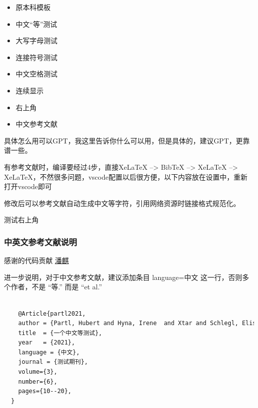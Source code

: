 \documentclass[AutoFakeBold]{LUTThesis}
\begin{document}
\begin{itemize}
    \item 原本科模板\cite{partl2016}
    \item 中文“等”测试\cite{partl2021}
    \item 大写字母测试\cite{partl2022-2}
    \item 连接符号测试\cite{partl2022-3}
    \item 中文空格测试\cite{partl2022}
    \item 连续显示\cite{partl2021,partl2022-2,partl2022-3}
    \item 右上角
    \item 中文参考文献 \cite{李刚2006基于动态光谱的脉搏血氧测量精度分析}
\end{itemize}


具体怎么用可以GPT，我这里告诉你什么可以用，但是具体的，建议GPT，更靠谱一些。


有参考文献时，编译要经过4步，直接XeLaTeX --> BibTeX --> XeLaTeX --> XeLaTeX，不然很多问题，vscode配置以后很方便，以下内容放在设置中，重新打开vscode即可

修改后可以参考文献自动生成中文等字符\cite{partl2021}\cite{partl2022}\cite{partl2022-2}，引用网络资源时链接格式规范化\cite{intelnewsroomIntelUnveils12th2021,wilsonHistoryDevelopmentParallel1994}。

测试右上角 

\subsubsection{中英文参考文献说明} %

感谢的代码贡献
\href{https://gitee.com/versemonger}{潘麒}

进一步说明，对于中文参考文献，建议添加条目 language={中文} 这一行，否则多个作者，不是 “等.”\cite{partl2021} 而是 “et al.”\cite{partl2016}
\begin{lstlisting}[language = tex]

    @Article{partl2021,
    author = {Partl, Hubert and Hyna, Irene  and Xtar and Schlegl, Elisabeth},
    title  = {一个中文等测试},
    year   = {2021},
    language = {中文},
    journal = {测试期刊},
    volume={3},
    number={6},
    pages={10--20},
  }
  
\end{lstlisting}



\end{document}
